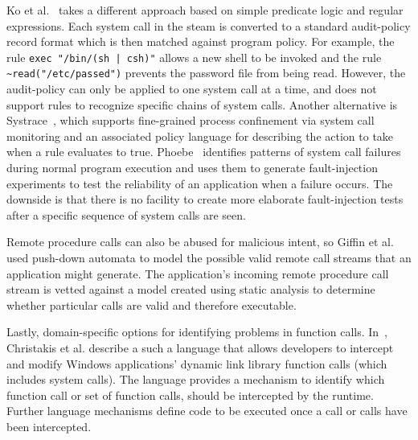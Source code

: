 
Ko et al.~\cite{DBLP:conf/acsac/KoFL94} 
takes a different approach
based on simple predicate logic and regular expressions. Each system call in the
steam is converted to a standard audit-policy record format which is then
matched against program policy. For example,
the rule \lstinline+exec "/bin/(sh | csh)"+ allows a new shell to be invoked and the rule
\lstinline+~read("/etc/passed")+ prevents the password file from being read.
However, the audit-policy can only be applied to
one system call at a time,
and does not support rules to recognize specific chains of system calls.
Another alternative is
Systrace~\cite{DBLP:conf/uss/Provos03},
which
supports fine-grained process confinement
via system call monitoring and an associated policy language 
for describing the action to take when a rule evaluates to true.
Phoebe~\cite{DBLP:journals/corr/abs-2006-04444}
identifies patterns of system call failures during normal program execution
and uses them to generate fault-injection experiments
to test the reliability of an application when a failure occurs.
The downside is that there is no facility to create more elaborate fault-injection
tests after a specific sequence of system calls are seen.

Remote procedure calls can also be abused for malicious
intent,
so Giffin et al. ~\cite{DBLP:conf/uss/GiffinJM02} used
push-down automata to model the possible valid
remote call streams that an application might generate.
The application's incoming remote procedure call stream 
is vetted against a model created using static analysis
to determine whether particular calls are valid and therefore executable.


Lastly, domain-specific options for
identifying problems
in function calls.
In~\cite{DBLP:conf/icse/ChristakisEG017}, Christakis et al. describe a
such a language that allows developers to intercept and modify
Windows applications’ dynamic link library function calls (which includes system
calls). The language provides a mechanism to identify which
function call or set of function calls, should be
intercepted by the runtime.
Further language mechanisms
define code to be executed once a call or calls have been intercepted.

